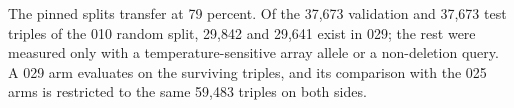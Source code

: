 The pinned splits transfer at 79 percent. Of the 37{,}673 validation and 37{,}673 test
triples of the 010 random split, 29{,}842 and 29{,}641 exist in 029; the rest were
measured only with a temperature-sensitive array allele or a non-deletion query.
A 029 arm evaluates on the surviving triples, and its comparison with the 025 arms is
restricted to the same 59{,}483 triples on both sides.
